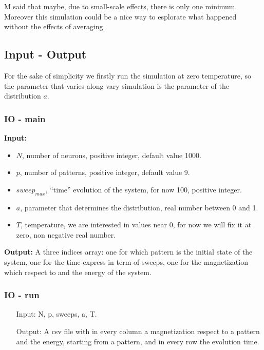 \documentclass[a4paper,10pt]{article}
\begin{document}
M said that maybe, due to small-scale effects, there is only one minimum. Moreover this simulation could be a nice way to esplorate what happened without the effects of averaging.

\subsection{Input - Output}

For the sake of simplicity we firstly run the simulation at zero temperature, so the parameter that varies along vary simulation is the parameter of the distribution $a$.


\subsubsection{IO - main}
\textbf{Input:}
\begin{itemize}
\item $N$, number of neurons, positive integer, default value 1000.
\item $p$, number of patterns, positive integer, default value 9.
\item $sweep_{max}$, ``time'' evolution of the system, for now 100, positive integer.
\item $a$, parameter that determines the distribution, real number between 0 and 1.
\item $T$, temperature, we are interested in values near 0, for now we will fix it at zero, non negative real number.
\end{itemize}
\textbf{Output:}
A three indices array: one for which pattern is the initial state of the system, one for the time express in term of sweeps, one for the magnetization which respect to and the energy of the system.

\subsubsection{IO - run}
\begin{itemize}
 \item[Input:] N, p, sweeps, a, T.
 \item[Output:] A csv file with in every column a magnetization respect to a pattern and the energy, starting from a pattern, and in every row the evolution time.
\end{itemize}
\end{document}
